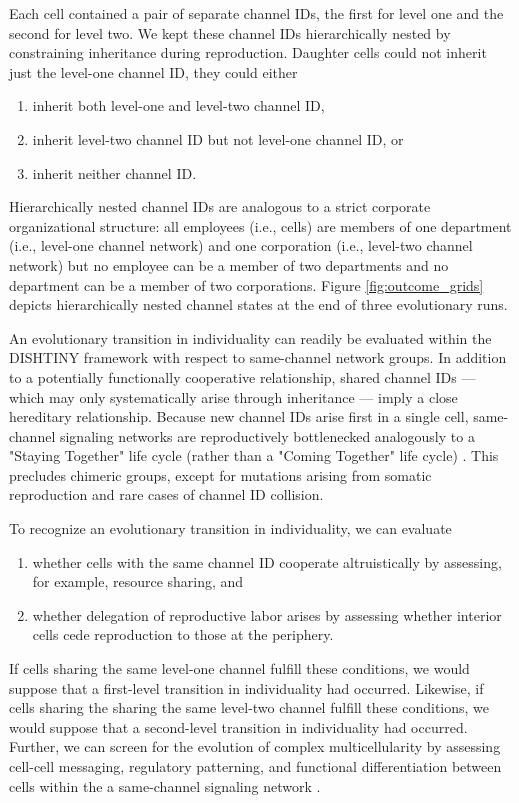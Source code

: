 Each cell contained a pair of separate channel IDs, the first for level one and the second for level two.
We kept these channel IDs hierarchically nested by constraining inheritance during reproduction.
Daughter cells could not inherit just the level-one channel ID, they could either
\begin{enumerate}
\item inherit both level-one and level-two channel ID,
\item inherit level-two channel ID but not level-one channel ID, or
\item inherit neither channel ID.
\end{enumerate}
Hierarchically nested channel IDs are analogous to a strict corporate organizational structure: all employees (i.e., cells) are members of one department (i.e., level-one channel network) and one corporation (i.e., level-two channel network) but no employee can be a member of two departments and no department can be a member of two corporations.
Figure \ref{fig:outcome_grids} depicts hierarchically nested channel states at the end of three evolutionary runs.

An evolutionary transition in individuality can readily be evaluated within the DISHTINY framework with respect to same-channel network groups.
In addition to a potentially functionally cooperative relationship, shared channel IDs --- which may only systematically arise through inheritance --- imply a close hereditary relationship.
Because new channel IDs arise first in a single cell, same-channel signaling networks are reproductively bottlenecked analogously to a "Staying Together" life cycle (rather than a "Coming Together" life cycle) \cite{staps2019emergence}.
This precludes chimeric groups, except for mutations arising from somatic reproduction and rare cases of channel ID collision.

To recognize an evolutionary transition in individuality, we can evaluate
\begin{enumerate}
\item whether cells with the same channel ID cooperate altruistically by assessing, for example, resource sharing, and
\item whether delegation of reproductive labor arises by assessing whether interior cells cede reproduction to those at the periphery.
\end{enumerate}
If cells sharing the same level-one channel fulfill these conditions, we would suppose that a first-level transition in individuality had occurred.
Likewise, if cells sharing the sharing the same level-two channel fulfill these conditions, we would suppose that a second-level transition in individuality had occurred.
Further, we can screen for the evolution of complex multicellularity by assessing cell-cell messaging, regulatory patterning, and functional differentiation between cells within the a same-channel signaling network \cite{knoll2011multiple}.


